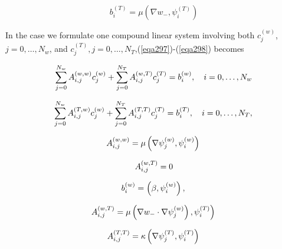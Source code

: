 \documentclass[../main.tex]{subfiles}
\begin{document}
		\begin{equation}
			\label{eqa296}
			b_{i}^{(T)}=\mu\left(\nabla w_{-}, \psi_{i}^{(T)}\right)
		\end{equation}
		
		In the case we formulate one compound linear system involving both $c_{j}^{(w)}$, $j=0, \ldots, N_{w}$, and $c_{j}^{(T)}, j=0, \ldots, N_{T}$,(\ref{eqa297})-(\ref{eqa298}) becomes

		\begin{equation}
			\label{eqa297}
			\sum_{j=0}^{N_{w}} A_{i, j}^{(w, w)} c_{j}^{(w)}+\sum_{j=0}^{N_{T}} A_{i, j}^{(w, T)} c_{j}^{(T)}=b_{i}^{(w)}, \quad i=0, \ldots, N_{w} \\
		\end{equation}
	
		\begin{equation}
			\label{eqa298}
			\sum_{j=0}^{N_{w}} A_{i, j}^{(T, w)} c_{j}^{(w)}+\sum_{j=0}^{N_{T}} A_{i, j}^{(T, T)} c_{j}^{(T)}=b_{i}^{(T)}, \quad i=0, \ldots, N_{T}, \\
		\end{equation}
	
		\begin{equation}
			\label{eqa299}
			A_{i, j}^{(w, w)}=\mu\left(\nabla \psi_{j}^{(w)}, \psi_{i}^{(w)}\right) \\
		\end{equation}
		
		\begin{equation}
			\label{eqa300}
			A_{i, j}^{(w, T)}=0 \\
		\end{equation}
	
		\begin{equation}
			\label{eqa301}	
			b_{i}^{(w)}=\left(\beta, \psi_{i}^{(w)}\right), \\
		\end{equation}
		
		\begin{equation}
			\label{eqa302}	
			A_{i, j}^{(w, T)}\left.=\mu\left(\nabla w_{-} \cdot \nabla \psi_{j}^{(w)}\right), \psi_{i}^{(T)}\right) \\
		\end{equation}

		\begin{equation}
			\label{eqa303}
			A_{i, j}^{(T, T)}=\kappa\left(\nabla \psi_{j}^{(T)}, \psi_{i}^{(T)}\right) \\
		\end{equation}
	
\end{document}
